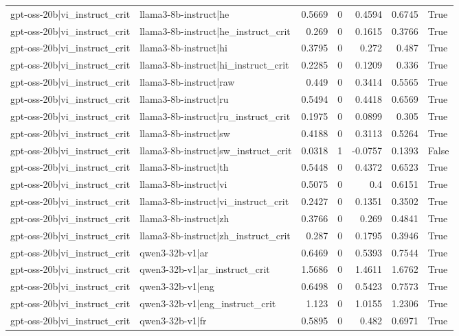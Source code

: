 \begin{table}
\begin{tabular}{l l r r r r l}
gpt-oss-20b|vi_instruct_crit & llama3-8b-instruct|he & 0.5669 & 0 & 0.4594 & 0.6745 & True \\
gpt-oss-20b|vi_instruct_crit & llama3-8b-instruct|he_instruct_crit & 0.269 & 0 & 0.1615 & 0.3766 & True \\
gpt-oss-20b|vi_instruct_crit & llama3-8b-instruct|hi & 0.3795 & 0 & 0.272 & 0.487 & True \\
gpt-oss-20b|vi_instruct_crit & llama3-8b-instruct|hi_instruct_crit & 0.2285 & 0 & 0.1209 & 0.336 & True \\
gpt-oss-20b|vi_instruct_crit & llama3-8b-instruct|raw & 0.449 & 0 & 0.3414 & 0.5565 & True \\
gpt-oss-20b|vi_instruct_crit & llama3-8b-instruct|ru & 0.5494 & 0 & 0.4418 & 0.6569 & True \\
gpt-oss-20b|vi_instruct_crit & llama3-8b-instruct|ru_instruct_crit & 0.1975 & 0 & 0.0899 & 0.305 & True \\
gpt-oss-20b|vi_instruct_crit & llama3-8b-instruct|sw & 0.4188 & 0 & 0.3113 & 0.5264 & True \\
gpt-oss-20b|vi_instruct_crit & llama3-8b-instruct|sw_instruct_crit & 0.0318 & 1 & -0.0757 & 0.1393 & False \\
gpt-oss-20b|vi_instruct_crit & llama3-8b-instruct|th & 0.5448 & 0 & 0.4372 & 0.6523 & True \\
gpt-oss-20b|vi_instruct_crit & llama3-8b-instruct|vi & 0.5075 & 0 & 0.4 & 0.6151 & True \\
gpt-oss-20b|vi_instruct_crit & llama3-8b-instruct|vi_instruct_crit & 0.2427 & 0 & 0.1351 & 0.3502 & True \\
gpt-oss-20b|vi_instruct_crit & llama3-8b-instruct|zh & 0.3766 & 0 & 0.269 & 0.4841 & True \\
gpt-oss-20b|vi_instruct_crit & llama3-8b-instruct|zh_instruct_crit & 0.287 & 0 & 0.1795 & 0.3946 & True \\
gpt-oss-20b|vi_instruct_crit & qwen3-32b-v1|ar & 0.6469 & 0 & 0.5393 & 0.7544 & True \\
gpt-oss-20b|vi_instruct_crit & qwen3-32b-v1|ar_instruct_crit & 1.5686 & 0 & 1.4611 & 1.6762 & True \\
gpt-oss-20b|vi_instruct_crit & qwen3-32b-v1|eng & 0.6498 & 0 & 0.5423 & 0.7573 & True \\
gpt-oss-20b|vi_instruct_crit & qwen3-32b-v1|eng_instruct_crit & 1.123 & 0 & 1.0155 & 1.2306 & True \\
gpt-oss-20b|vi_instruct_crit & qwen3-32b-v1|fr & 0.5895 & 0 & 0.482 & 0.6971 & True \\

\end{tabular}
\end{table}
